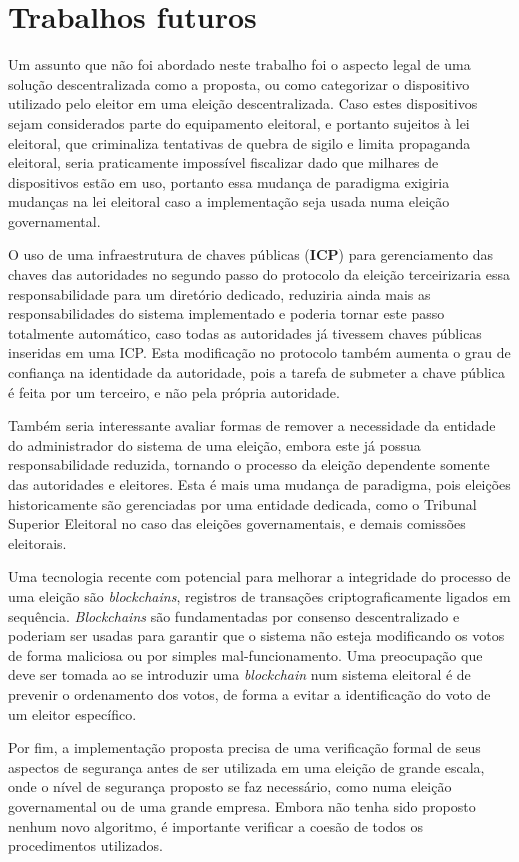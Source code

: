 \section{Trabalhos futuros}

Um assunto que não foi abordado neste trabalho foi o aspecto legal de uma
solução descentralizada como a proposta, ou como categorizar o dispositivo
utilizado pelo eleitor em uma eleição descentralizada. Caso estes dispositivos
sejam considerados parte do equipamento eleitoral, e portanto sujeitos à lei
eleitoral, que criminaliza tentativas de quebra de sigilo e limita propaganda
eleitoral, seria praticamente impossível fiscalizar dado que milhares de
dispositivos estão em uso, portanto essa mudança de paradigma exigiria mudanças
na lei eleitoral caso a implementação seja usada numa eleição governamental.

O uso de uma infraestrutura de chaves públicas (\textbf{ICP}) para
gerenciamento das chaves das autoridades no segundo passo do protocolo da
eleição terceirizaria essa responsabilidade para um diretório dedicado,
reduziria ainda mais as responsabilidades do sistema implementado e poderia
tornar este passo totalmente automático, caso todas as autoridades já tivessem
chaves públicas inseridas em uma ICP. Esta modificação no protocolo também
aumenta o grau de confiança na identidade da autoridade, pois a tarefa de
submeter a chave pública é feita por um terceiro, e não pela própria
autoridade.

Também seria interessante avaliar formas de remover a necessidade da entidade
do administrador do sistema de uma eleição, embora este já possua
responsabilidade reduzida, tornando o processo da eleição dependente somente
das autoridades e eleitores. Esta é mais uma mudança de paradigma, pois
eleições historicamente são gerenciadas por uma entidade dedicada, como o
Tribunal Superior Eleitoral no caso das eleições governamentais, e demais
comissões eleitorais.

Uma tecnologia recente com potencial para melhorar a integridade do processo de
uma eleição são \textit{blockchains}, registros de transações
criptograficamente ligados em sequência. \textit{Blockchains} são fundamentadas
por consenso descentralizado e poderiam ser usadas para garantir que o sistema
não esteja modificando os votos de forma maliciosa ou por simples
mal-funcionamento. Uma preocupação que deve ser tomada ao se introduzir uma
\textit{blockchain} num sistema eleitoral é de prevenir o ordenamento dos
votos, de forma a evitar a identificação do voto de um eleitor específico.

Por fim, a implementação proposta precisa de uma verificação formal de seus
aspectos de segurança antes de ser utilizada em uma eleição de grande escala,
onde o nível de segurança proposto se faz necessário, como numa eleição
governamental ou de uma grande empresa. Embora não tenha sido proposto nenhum
novo algoritmo, é importante verificar a coesão de todos os procedimentos
utilizados.
